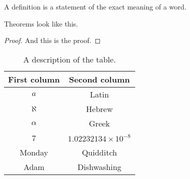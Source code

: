 \begin{definition}
 A definition is a statement of the exact meaning of a word.
\end{definition}


\begin{theorem}
 Theorems look like this. 
\end{theorem}
\begin{proof}
 And this is the proof.
\end{proof}

\begin{table}
\centering
\begin{tabular}{|c|c|}
\hline
First column & Second column\\\hline
$a$          & Latin \\
$\aleph$     & Hebrew \\
$\alpha$     & Greek \\
7            & $1.02232134\times10^{-8}$\\
Monday       & Quidditch\\
Adam         & Dishwashing\\
\hline
\end{tabular}
\caption{A description of the table.} 

\label{Tab1}
\end{table}


